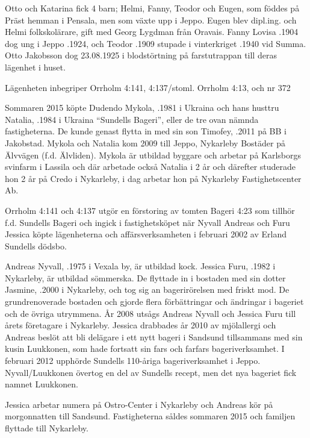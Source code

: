 Otto och Katarina fick 4 barn; Helmi, Fanny, Teodor och Eugen, som föddes på Präst hemman i Pensala, men som växte upp i Jeppo. Eugen blev dipl.ing. och Helmi folkskolärare, gift med Georg Lygdman från Oravais. Fanny Lovisa .1904 dog ung i Jeppo .1924, och Teodor .1909 stupade i vinterkriget .1940 vid Summa. Otto Jakobsson dog 23.08.1925 i blodstörtning på farstutrappan till deras lägenhet i huset.



Lägenheten inbegriper Orrholm 4:141, 4:137/stoml. Orrholm 4:13, och nr 372

Sommaren 2015 köpte Dudendo Mykola, .1981 i Ukraina och hans husttru Natalia, .1984 i Ukraina ``Sundells Bageri'', eller de tre ovan nämnda fastigheterna. De kunde genast flytta in med sin son Timofey, .2011 på BB i Jakobstad. Mykola och Natalia kom 2009 till Jeppo, Nykarleby Bostäder på Älvvägen (f.d. Älvliden). Mykola är utbildad byggare och arbetar på Karlsborgs svinfarm i Lassila och där arbetade också Natalia i 2 år och därefter studerade hon 2 år på Credo i Nykarleby, i dag arbetar hon på Nykarleby Fastighetscenter Ab.

Orrholm  4:141 och 4:137 utgör en förstoring av tomten Bageri 4:23 som tillhör f.d. Sundells Bageri och ingick i fastighetsköpet när Nyvall Andreas och Furu Jessica köpte lägenheterna och affärsverksamheten i februari 2002 av Erland Sundells dödsbo.

Andreas Nyvall, .1975 i Vexala by, är utbildad kock. Jessica Furu, .1982 i Nykarleby, är utbildad sömmerska. De flyttade in i bostaden med sin dotter Jasmine, .2000 i Nykarleby, och tog sig an bagerirörelsen med friskt mod. De grundrenoverade bostaden och gjorde flera förbättringar och ändringar i bageriet och de övriga utrymmena.
År 2008 utsågs Andreas Nyvall och Jessica Furu till årets företagare i Nykarleby. Jessica drabbades år 2010 av mjölallergi och Andreas beslöt att bli delägare i ett nytt bageri i Sandsund tillsammans med sin kusin Luukkonen, som hade fortsatt sin fars och farfars bageriverksamhet. I februari 2012 upphörde Sundells 110-åriga bageriverksamhet i Jeppo. Nyvall/Luukkonen övertog en del av Sundells recept, men det nya bageriet fick namnet Luukkonen.
\begin{jhchildren}
  \item {}
  \item {}
  \item {}
\end{jhchildren}
Jessica arbetar numera på Ostro-Center i Nykarleby och Andreas kör på morgonnatten till Sandsund. Fastigheterna såldes sommaren 2015 och familjen flyttade till Nykarleby.


